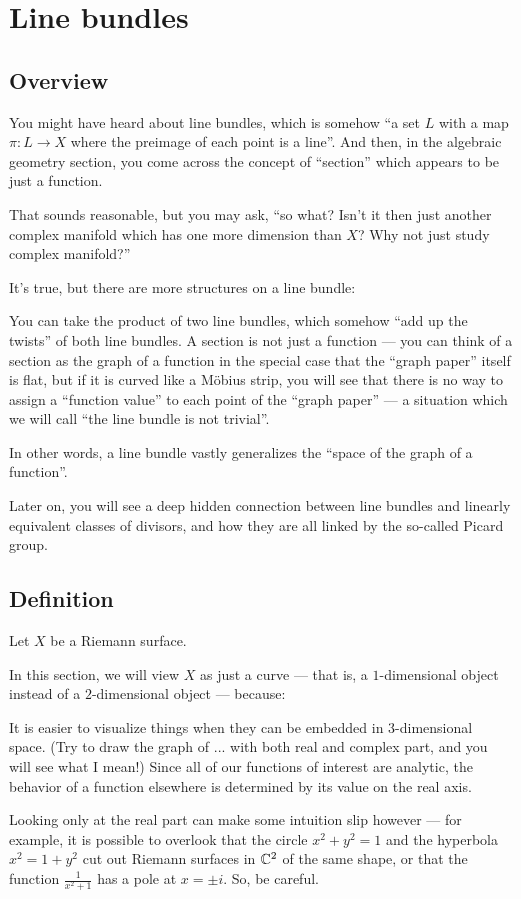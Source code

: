 \chapter{Line bundles}
\label{ch:line_bundles}

\section{Overview}

You might have heard about line bundles, which is somehow ``a set $L$ with a map $\pi \colon L \to
X$ where the preimage of each point is a line''.
And then, in the algebraic geometry section, you come across the concept of ``section'' which
appears to be just a function.

That sounds reasonable, but you may ask, ``so what? Isn't it then just another complex manifold
which has one more dimension than $X$? Why not just study complex manifold?''

It's true, but there are more structures on a line bundle:
\begin{itemize}
	\ii You can take the product of two line bundles, which somehow ``add up the twists'' of
	both line bundles.
	\ii A section is not just a function --- you can think of a section as the graph of a function
	in the special case that the ``graph paper'' itself is flat, but if it is curved like a M\"obius
	strip, you will see that there is no way to assign a ``function value'' to each point of the
	``graph paper'' --- a situation which we will call ``the line bundle is not trivial''.
\end{itemize}

In other words, a line bundle vastly generalizes the ``space of the graph of a function''.

Later on, you will see a deep hidden connection between line bundles and linearly equivalent classes
of divisors, and how they are all linked by the so-called Picard group.

\section{Definition}

Let $X$ be a Riemann surface.

In this section, we will view $X$ as just a curve --- that is, a $1$-dimensional object instead of a
$2$-dimensional object --- because:
\begin{itemize}
	\ii It is easier to visualize things when they can be embedded in $3$-dimensional space.
	(Try to draw the graph of ... with both real and complex part, and you will see what I mean!)
	\ii Since all of our functions of interest are analytic, the behavior of a function elsewhere is
	determined by its value on the real axis.
\end{itemize}
Looking only at the real part can make some intuition slip however --- for example, it is
possible to overlook that the circle $x^2 + y^2 = 1$ and the hyperbola $x^2 = 1 + y^2$ cut out
Riemann surfaces in $\mathbb C^2$ of the same shape, or that the function $\frac{1}{x^2 + 1}$ has a pole
at $x = \pm i$. So, be careful.

